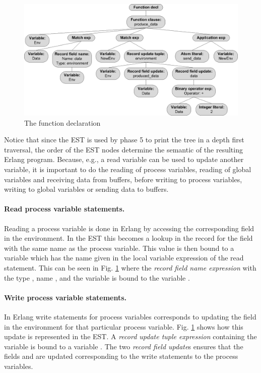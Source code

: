 \begin{figure}
\centering
\includegraphics[width=\textwidth]{translation/ast_to_est/graphics/producerest02.eps}
\caption{The function declaration }
\label{fig:prodproducefunc}
\end{figure}

Notice that since the EST is used by phase 5 to print the tree in a depth first traversal, the order of the EST nodes determine the semantic of the resulting Erlang program. Because, e.g., a read variable can be used to update another variable, it is important to do the reading of process variables, reading of global variables and receiving data from buffers, before writing to process variables, writing to global variables or sending data to buffers.

\paragraph*{Read process variable statements.} 
Reading a process variable is done in Erlang by accessing the corresponding field in the environment. In the EST this becomes a lookup in the record for the field with the same name as the process variable. This value is then bound to a variable which has the name given in the local variable expression of the read statement. This can be seen in Fig. \ref{fig:prodproducefunc} where the \emph{record field name expression} with the type , name , and the variable  is bound to the variable .

\paragraph*{Write process variable statements.}
In Erlang write statements for process variables corresponds to updating the field in the environment for that particular process variable. Fig. \ref{fig:prodproducefunc} shows how this update is represented in the EST. A \emph{record update tuple expression} containing the variable  is bound to a variable . The two \emph{record field update}s ensures that the fields  and  are updated corresponding to the write statements to the process variables.

